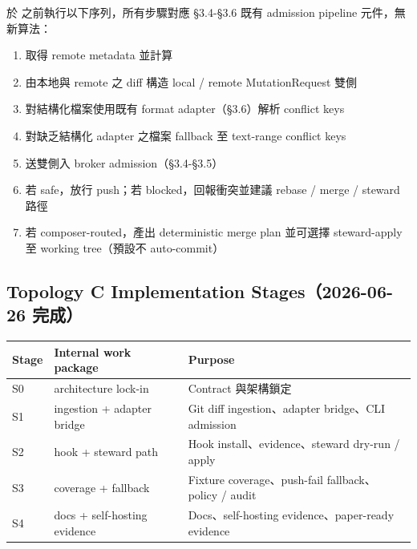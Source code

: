 \documentclass[a4paper,fontset=none]{ctexart}
\begin{document}
\texttt{} 於 \texttt{} 之前執行以下序列，所有步驟對應 §3.4-§3.6 既有 admission pipeline 元件，無新算法：

\begin{enumerate}
\item \texttt{} 取得 remote metadata 並計算 \texttt{}
\item 由本地與 remote 之 diff 構造 local / remote MutationRequest 雙側
\item 對結構化檔案使用既有 format adapter（§3.6）解析 conflict keys
\item 對缺乏結構化 adapter 之檔案 fallback 至 text-range conflict keys
\item 送雙側入 broker admission（§3.4-§3.5）
\item 若 safe，放行 push；若 blocked，回報衝突並建議 rebase / merge / steward 路徑
\item 若 composer-routed，產出 deterministic merge plan 並可選擇 steward-apply 至 working tree（預設不 auto-commit）
\end{enumerate}

\subsection*{Topology C Implementation Stages（2026-06-26 完成）}

\smallskip{}\par\smallskip

\begingroup
\footnotesize
{}
\begin{longtable}{L{0.28\textwidth}L{0.28\textwidth}L{0.28\textwidth}}
\toprule
Stage & Internal work package & Purpose \\
\midrule
S0 & architecture lock-in & Contract 與架構鎖定 \\
S1 & ingestion + adapter bridge & Git diff ingestion、adapter bridge、CLI admission \\
S2 & hook + steward path & Hook install、evidence、steward dry-run / apply \\
S3 & coverage + fallback & Fixture coverage、push-fail fallback、policy / audit \\
S4 & docs + self-hosting evidence & Docs、self-hosting evidence、paper-ready evidence \\
\bottomrule
\end{longtable}
\endgroup
\end{document}
